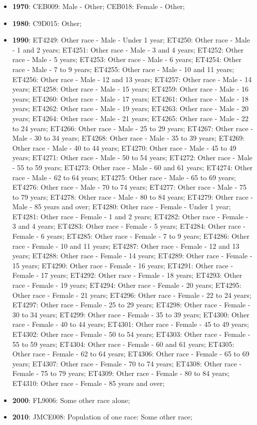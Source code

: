 \documentclass[a4paper]{article}
\begin{document}
\begin{itemize}
   \item{\textbf{1970}:  CEB009: Male - Other; CEB018: Female - Other;}
   \item{\textbf{1980}:  C9D015: Other;}
   \item{\textbf{1990}:  ET4249: Other race - Male - Under 1 year; ET4250: Other race - Male - 1 and 2 years; ET4251: Other race - Male - 3 and 4 years; ET4252: Other race - Male - 5 years; ET4253: Other race - Male - 6 years; ET4254: Other race - Male - 7 to 9 years; ET4255: Other race - Male - 10 and 11 years; ET4256: Other race - Male - 12 and 13 years; ET4257: Other race - Male - 14 years; ET4258: Other race - Male - 15 years; ET4259: Other race - Male - 16 years; ET4260: Other race - Male - 17 years; ET4261: Other race - Male - 18 years; ET4262: Other race - Male - 19 years; ET4263: Other race - Male - 20 years; ET4264: Other race - Male - 21 years; ET4265: Other race - Male - 22 to 24 years; ET4266: Other race - Male - 25 to 29 years; ET4267: Other race - Male - 30 to 34 years; ET4268: Other race - Male - 35 to 39 years; ET4269: Other race - Male - 40 to 44 years; ET4270: Other race - Male - 45 to 49 years; ET4271: Other race - Male - 50 to 54 years; ET4272: Other race - Male - 55 to 59 years; ET4273: Other race - Male - 60 and 61 years; ET4274: Other race - Male - 62 to 64 years; ET4275: Other race - Male - 65 to 69 years; ET4276: Other race - Male - 70 to 74 years; ET4277: Other race - Male - 75 to 79 years; ET4278: Other race - Male - 80 to 84 years; ET4279: Other race - Male - 85 years and over; ET4280: Other race - Female - Under 1 year; ET4281: Other race - Female - 1 and 2 years; ET4282: Other race - Female - 3 and 4 years; ET4283: Other race - Female - 5 years; ET4284: Other race - Female - 6 years; ET4285: Other race - Female - 7 to 9 years; ET4286: Other race - Female - 10 and 11 years; ET4287: Other race - Female - 12 and 13 years; ET4288: Other race - Female - 14 years; ET4289: Other race - Female - 15 years; ET4290: Other race - Female - 16 years; ET4291: Other race - Female - 17 years; ET4292: Other race - Female - 18 years; ET4293: Other race - Female - 19 years; ET4294: Other race - Female - 20 years; ET4295: Other race - Female - 21 years; ET4296: Other race - Female - 22 to 24 years; ET4297: Other race - Female - 25 to 29 years; ET4298: Other race - Female - 30 to 34 years; ET4299: Other race - Female - 35 to 39 years; ET4300: Other race - Female - 40 to 44 years; ET4301: Other race - Female - 45 to 49 years; ET4302: Other race - Female - 50 to 54 years; ET4303: Other race - Female - 55 to 59 years; ET4304: Other race - Female - 60 and 61 years; ET4305: Other race - Female - 62 to 64 years; ET4306: Other race - Female - 65 to 69 years; ET4307: Other race - Female - 70 to 74 years; ET4308: Other race - Female - 75 to 79 years; ET4309: Other race - Female - 80 to 84 years; ET4310: Other race - Female - 85 years and over;}
   \item{\textbf{2000}:  FL9006: Some other race alone;}
   \item{\textbf{2010}:  JMCE008: Population of one race: Some other race;}
\end{itemize}
\end{document}
